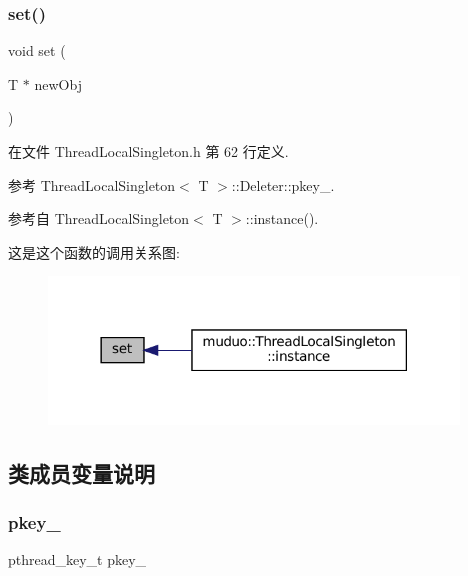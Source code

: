 \subsubsection{\texorpdfstring{set()}{set()}}
{\footnotesize\ttfamily void set (\begin{DoxyParamCaption}\item[{T $\ast$}]{new\+Obj }\end{DoxyParamCaption})\hspace{0.3cm}{\ttfamily [inline]}}



在文件 Thread\+Local\+Singleton.\+h 第 62 行定义.



参考 Thread\+Local\+Singleton$<$ T $>$\+::\+Deleter\+::pkey\+\_\+.



参考自 Thread\+Local\+Singleton$<$ T $>$\+::instance().

这是这个函数的调用关系图\+:
\nopagebreak
\begin{figure}[H]
\begin{center}
\leavevmode
\includegraphics[width=309pt]{classmuduo_1_1ThreadLocalSingleton_1_1Deleter_a7f9f5041a16baf883423c1ca895b5f46_icgraph}
\end{center}
\end{figure}


\subsection{类成员变量说明}
\mbox{\label{classmuduo_1_1ThreadLocalSingleton_1_1Deleter_a10ef6ab4122ca7977f07a8c475f54017}} 
\subsubsection{\texorpdfstring{pkey\+\_\+}{pkey\_}}
{\footnotesize\ttfamily pthread\+\_\+key\+\_\+t pkey\+\_\+}



